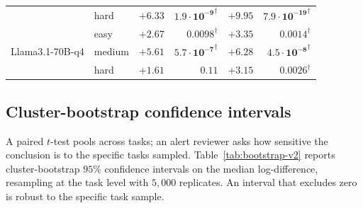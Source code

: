 \documentclass[11pt]{article}
\newcommand{\hurts}{\text{$\dagger$}}
\begin{document}
\begin{table}[t]
\begin{tabular}{l l rr rr}
  & hard   & $+6.33$ & $\mathbf{1.9\!\cdot\!10^{-9}}^{\hurts}$   & $+9.95$ & $\mathbf{7.9\!\cdot\!10^{-19}}^{\hurts}$ \\
\multirow{3}{*}{Llama3.1-70B-q4}
  & easy   & $+2.67$ & $\mathbf{0.0098}^{\hurts}$ & $+3.35$ & $\mathbf{0.0014}^{\hurts}$ \\
  & medium & $+5.61$ & $\mathbf{5.7\!\cdot\!10^{-7}}^{\hurts}$  & $+6.28$ & $\mathbf{4.5\!\cdot\!10^{-8}}^{\hurts}$ \\
  & hard   & $+1.61$ & $0.11$                    & $+3.15$ & $\mathbf{0.0026}^{\hurts}$ \\
\bottomrule
\end{tabular}
\end{table}

\subsection{Cluster-bootstrap confidence intervals}

A paired $t$-test pools across tasks; an alert reviewer asks how
sensitive the conclusion is to the specific tasks sampled.
Table~\ref{tab:bootstrap-v2} reports cluster-bootstrap $95\%$
confidence intervals on the median log-difference, resampling at
the task level with $5{,}000$ replicates.  An interval that
excludes zero is robust to the specific task sample.
\end{document}
